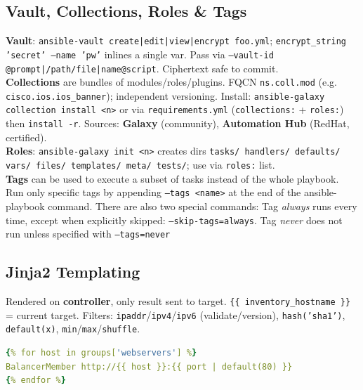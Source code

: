 \subsection{Vault, Collections, Roles \& Tags}
\textbf{Vault}: \texttt{ansible-vault create|edit|view|encrypt foo.yml}; \texttt{encrypt\_string 'secret' --name 'pw'} inlines a single var. Pass via \texttt{--vault-id @prompt|/path/file|name@script}. Ciphertext safe to commit. \\
\textbf{Collections} are bundles of modules/roles/plugins. FQCN \texttt{ns.coll.mod} (e.g. \texttt{cisco.ios.ios\_banner}); independent versioning. Install: \texttt{ansible-galaxy collection install <n>} or via \texttt{requirements.yml} (\texttt{collections:} + \texttt{roles:}) then \texttt{install -r}. Sources: \textbf{Galaxy} (community), \textbf{Automation Hub} (RedHat, certified). \\
\textbf{Roles}: \texttt{ansible-galaxy init <n>} creates dirs \texttt{tasks/ handlers/ defaults/ vars/ files/ templates/ meta/ tests/}; use via \texttt{roles:} list. \\
\textbf{Tags} can be used to execute a subset of tasks instead of the whole playbook. Run only specific tags by appending \texttt{--tags <name>} at the end of the ansible-playbook command. There are also two special commands: Tag \textit{always} runs every time, except when explicitly skipped: \texttt{--skip-tags=always}. Tag \textit{never} does not run unless specified with \texttt{--tags=never}
\subsection{Jinja2 Templating}
Rendered on \textbf{controller}, only result sent to target. \texttt{\{\{ inventory\_hostname \}\}} = current target. Filters: \texttt{ipaddr}/\texttt{ipv4}/\texttt{ipv6} (validate/version), \texttt{hash('sha1')}, \texttt{default(x)}, \texttt{min}/\texttt{max}/\texttt{shuffle}.
\begin{lstlisting}[language=yaml]
{% for host in groups['webservers'] %}
BalancerMember http://{{ host }}:{{ port | default(80) }}
{% endfor %}
\end{lstlisting}
